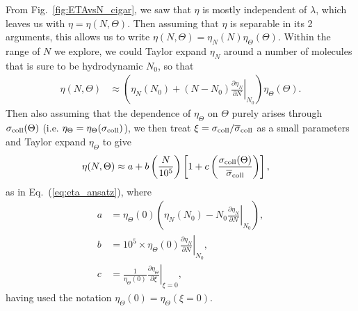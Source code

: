 \documentclass[reprint, amsmath, amssymb, aps, superscriptaddress]{revtex4-1}
\begin{document}
From Fig.~\ref{fig:ETAvsN_cigar}, we saw that $\eta$ is mostly independent of $\lambda$, which leaves us with $\eta = \eta( N, \Theta )$. Then assuming that $\eta$ is separable in its 2 arguments, this allows us to write $\eta( N, \Theta ) = \eta_N( N ) \eta_{\Theta}( \Theta )$. 
Within the range of $N$ we explore, we could Taylor expand $\eta_N$ around a number of molecules that is sure to be hydrodynamic $N_0$, so that
\begin{align}
    \eta( N, \Theta )
    &\approx 
    \left(
    \eta_N (N_0)
    +
    ( N - N_0 )
    \left. \frac{ \partial \eta_N }{ \partial N } \right|_{N_0}
    \right)
    \eta_{\Theta}( \Theta ). 
\end{align}
Then also assuming that the dependence of $\eta_{\Theta}$ on $\Theta$ purely arises through $\sigma_{\rm coll}(\Theta)$ (i.e. $\eta_{\Theta} = \eta_{\Theta}( \sigma_{\rm coll} )$), we then treat $\xi = \sigma_{\rm coll} / \overline{\sigma}_{\rm coll}$ as a small parameters and Taylor expand $\eta_{\Theta}$ to give
\begin{align}
    \eta( N, \Theta )
    &\approx 
    a 
    +
    b 
    \left( \frac{ N }{ 10^5 } \right)
    \left[
    1
    +
    c \left( \frac{ \sigma_{\rm coll}(\Theta) }{ \overline{\sigma}_{\rm coll} } \right)
    \right],
\end{align}
as in Eq.~(\ref{eq:eta_ansatz}), where 
\begin{subequations}
\begin{align}
    a 
    &=
    \eta_{\Theta}(0) 
    \left(
    \eta_N (N_0)
    -
    N_0
    \left. \frac{ \partial \eta_N }{ \partial N } \right|_{N_0}
    \right), \\
    b
    &=
    10^5 \times 
    \eta_{\Theta}(0)
    \left. \frac{ \partial \eta_N }{ \partial N } \right|_{N_0}, \\
    c
    &=
    \frac{ 1 }{ \eta_{\Theta}(0) }
    \left. \frac{ \partial \eta_{\Theta} }{ \partial \xi } \right|_{\xi = 0},
\end{align}
\end{subequations}
having used the notation $\eta_{\Theta}(0) = \eta_{\Theta}( \xi = 0 )$. 













\nocite{*}
 
\end{document}
